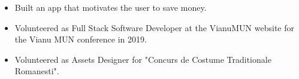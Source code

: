 \begin{itemize}
    \item Built an app that motivates the user to save money.
\end{itemize}
\begin{itemize}
    \item Volunteered as Full Stack Software Developer at the VianuMUN website for the Vianu MUN conference in 2019.
    \item Volunteered as Assets Designer for "Concurs de Costume Traditionale Romanesti".
\end{itemize}